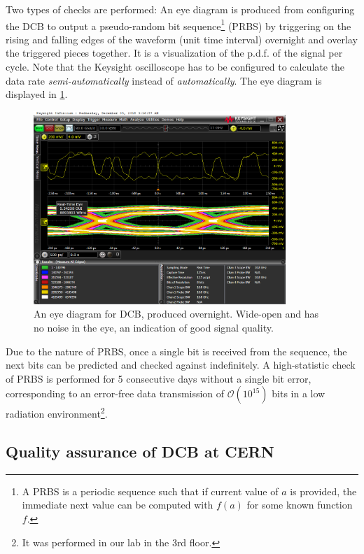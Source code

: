 Two types of checks are performed:
An eye diagram is produced from configuring the DCB to output a pseudo-random
bit sequence\footnote{
    A PRBS is a periodic sequence such that if current value of $a$ is provided,
    the immediate next value can be computed with $f(a)$ for some known function
    $f$.
} (PRBS) by triggering on the rising and falling edges
of the waveform (unit time interval) overnight and overlay the triggered pieces
together.
It is a visualization of the p.d.f. of the signal per cycle.
Note that the Keysight oscilloscope has to be configured to calculate the
data rate \emph{semi-automatically} instead of \emph{automatically}.
The eye diagram is displayed in \cref{fig:dcb-eye}.

\begin{figure}[!htb]
    \centering
    \includegraphics[width=0.85\textwidth]{./figs-ut-upgrade/dcb/dcb_eye_diagram.png}
    \caption{
        An eye diagram for DCB, produced overnight.
        Wide-open and has no noise in the eye, an indication of good signal
        quality.
    }
    \label{fig:dcb-eye}
\end{figure}

Due to the nature of PRBS, once a single bit is received from the sequence,
the next bits can be predicted and checked against indefinitely.
A high-statistic check of PRBS is performed for 5 consecutive days without
a single bit error, corresponding to an error-free data transmission of
$\mathcal{O}(10^{15})$ bits in a low radiation environment\footnote{
    It was performed in our lab in the 3rd floor.
}.


\subsection{Quality assurance of DCB at CERN}
\label{dcb-qa}

